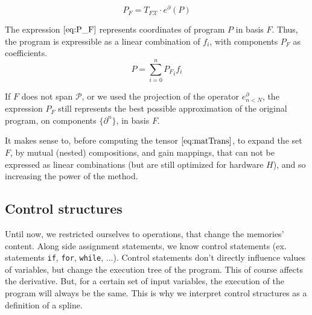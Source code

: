 \documentclass{article}
\newcommand{\X}{\mathcal{X}}
\newcommand{\dP}{\mathcal{P}}
\newcommand{\D}{\partial}
\begin{document}
  \begin{equation}\label{eq:P_F}
  	P_F=T_{F\X}\cdot e^\D(P)
  \end{equation}
  
  The expression $\eqref{eq:P_F}$ represents coordinates of program $P$ in basis $F$. Thus, the program is expressible as a linear combination of $f_i$, with components $P_F$ as coefficients.
  \begin{equation}
  P=\sum\limits_{i=0}^{n}{P_F}_if_i
  \end{equation}
  
  If $F$ does not span $\dP$, or we used the projection of the operator $e^\D_{n<N}$, the expression $P_F$ still represents the best possible approximation of the original program, on components $\{\D^n\}$, in basis $F$.
  
  It makes sense to, before computing the tensor $\eqref{eq:matTrans}$, to expand the set $F$, by mutual (nested) compositions, and gain mappings, that can not be expressed as linear combinations (but are still optimized for hardware $H$), and so increasing the power of the method.
  
 \subsection{Control structures}
 
 Until now, we restricted ourselves to operations, that change the memories' content. Along side assignment statements, we know control statements (ex. statements \texttt{if},
  \texttt{for}, \texttt{while}, ...). Control statements don't directly influence values of variables, but change the execution tree of the program. This of course affects the derivative. But, for a certain set of input variables, the execution of the program will always be the same. This is why we interpret control structures as a definition of a spline.
  
\end{document}
